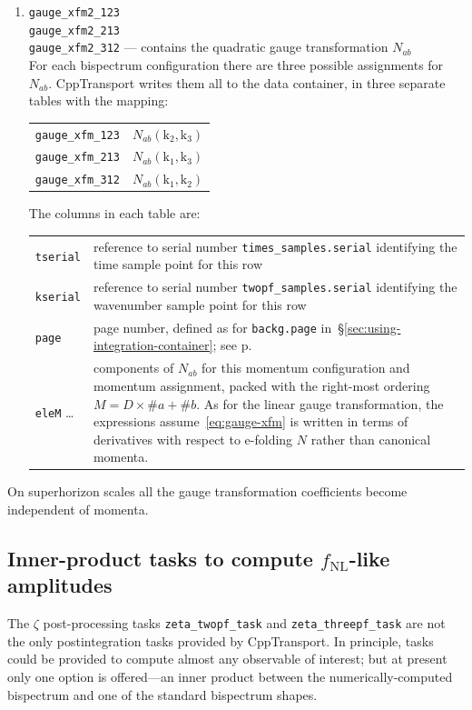 \documentclass[11pt,a4paper]{article}
\newcommand{\fNL}{f_{\mathrm{NL}}}
\newcommand{\vect}[1]{\bm{\mathrm{{#1}}}}
\newcommand{\packagefont}{\sffamily}
\newcommand{\CppTransport}{{\packagefont CppTransport}}
\newenvironment{sqltablelist}{\renewcommand{\arraystretch}{1.3}\small}{}
\begin{document}
\begin{sqltablelist}
\begin{enumerate}
	\item \texttt{gauge_xfm2_123} \\
    \texttt{gauge_xfm2_213} \\
    \texttt{gauge_xfm2_312} --- contains the quadratic gauge transformation $N_{ab}$ \\
    For each bispectrum configuration there are three possible assignments
    for $N_{ab}$.
    {\CppTransport} writes them all to the data container, in three separate tables
    with the mapping: \\
    \begin{tabular}{p{2.5cm}p{11.5cm}}
    	\texttt{gauge_xfm_123} & $N_{ab}(\vect{k}_2, \vect{k}_3)$ \\
    	\texttt{gauge_xfm_213} & $N_{ab}(\vect{k}_1, \vect{k}_3)$ \\
    	\texttt{gauge_xfm_312} & $N_{ab}(\vect{k}_1, \vect{k}_2)$
    \end{tabular}
	The columns in each table are: \\
	\begin{tabular}{p{2.5cm}p{11.5cm}}
		\texttt{tserial} & reference to serial number \texttt{times_samples.serial}
        identifying the time sample point for this row \\
        \texttt{kserial} & reference to serial number \texttt{twopf_samples.serial}
        identifying the wavenumber sample point for this row \\
        \texttt{page} & page number, defined as for \texttt{backg.page}
        in~\S\ref{sec:using-integration-container}; see p.\pageref{sqltable:backg} \\
        \texttt{eleM} \ldots & components of $N_{ab}$ for this
        momentum configuration and momentum assignment, packed with the right-most
        ordering $M = D \times \#a + \#b$.
        As for the linear gauge transformation, the expressions assume~\eqref{eq:gauge-xfm}
        is written in terms of derivatives with respect to e-folding $N$
        rather than canonical momenta.
	\end{tabular}
\end{enumerate}	
\end{sqltablelist}
On superhorizon scales all the gauge transformation coefficients become independent of
momenta.

\subsection{Inner-product tasks to compute $\fNL$-like amplitudes}
\label{sec:inner-products}
The $\zeta$ post-processing tasks
\texttt{zeta_twopf_task} and
\texttt{zeta_threepf_task}
are not the only postintegration tasks provided by {\CppTransport}.
In principle, tasks could be provided to compute almost any observable of interest;
but at present only one option is offered---an inner product between the
numerically-computed bispectrum and one of the standard bispectrum shapes.
\end{document}
